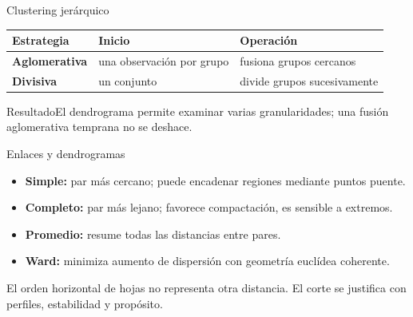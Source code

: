 \documentclass[aspectratio=169,10pt]{beamer}
\newcommand{\concepto}[1]{\textcolor{UAPTeal}{\textbf{#1}}}
\begin{document}
\begin{frame}{Clustering jerárquico}\small
\begin{tabularx}{\textwidth}{>{\bfseries}p{}XX}\toprule Estrategia & Inicio & Operación\\\midrule Aglomerativa & una observación por grupo & fusiona grupos cercanos\\ Divisiva & un conjunto & divide grupos sucesivamente\\\bottomrule\end{tabularx}
\begin{block}{Resultado}El dendrograma permite examinar varias granularidades; una fusión aglomerativa temprana no se deshace.\end{block}
\end{frame}

\begin{frame}{Enlaces y dendrogramas}\small
\begin{itemize}\item \concepto{Simple:} par más cercano; puede encadenar regiones mediante puntos puente.\item \concepto{Completo:} par más lejano; favorece compactación, es sensible a extremos.\item \concepto{Promedio:} resume todas las distancias entre pares.\item \concepto{Ward:} minimiza aumento de dispersión con geometría euclídea coherente.\end{itemize}
El orden horizontal de hojas no representa otra distancia. El corte se justifica con perfiles, estabilidad y propósito.
\end{frame}
\end{document}
